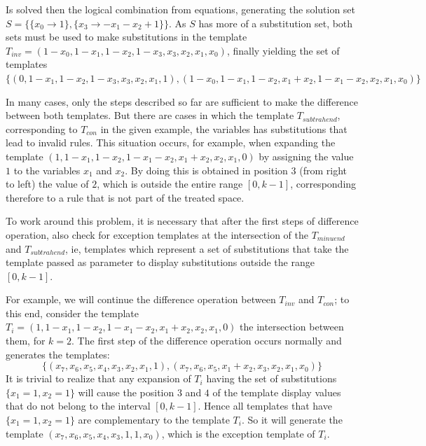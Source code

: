 \documentclass{llncs}
\begin{document}
Is solved then the logical combination from equations, generating the solution set $S = \{\{x_0\to 1\},\{x_3\to -x_1-x_2+1\}\}$. As $S$ has more of a substitution set, both sets must be used to make substitutions in the template $T_{inv} = (1 - x_0, 1 - x_1, 1 - x_2, 1 - x_3, x_3, x_2, x_1, x_0)$, finally yielding the set of templates $\{(0, 1 - x_1, 1 - x_2, 1 - x_3, x_3, x_2, x_1, 1),(1 - x_0, 1 - x_1, 1 - x_2, x_1 + x_2, 1 - x_1 - x_2, x_2, x_1, x_0)\}$

In many cases, only the steps described so far are sufficient to make the difference between both templates. But there are cases in which the template $T_{subtrahend}$, corresponding to $T_{con}$ in the given example, the variables has substitutions that lead to invalid rules. This situation occurs, for example, when expanding the template $(1, 1 - x_1, 1 - x_2, 1 - x_1 - x_2, x_1 + x_2, x_2, x_1, 0)$ by assigning the value $1$ to the variables $x_1$ and $x_2$. By doing this is obtained in position $3$ (from right to left) the value of $2$, which is outside the entire range $[0, k-1]$, corresponding therefore to a rule that is not part of the treated space.

To work around this problem, it is necessary that after the first steps of difference operation, also check for exception templates at the intersection of the $T_{minuend}$ and $T_{subtrahend}$, ie, templates which represent a set of substitutions that take the template passed as parameter to display  substitutions outside the range $[0,k-1]$. %

For example, we will continue the difference operation between $T_{inv}$ and $T_{con}$; to this end, consider the template $T_i = (1, 1 - x_1, 1 - x_2, 1 - x_1 - x_2, x_1 + x_2, x_2, x_1, 0)$ the intersection between them, for $k=2$.
The first step of the difference operation occurs normally and generates the templates: 
\begin{displaymath}
\{(x_7, x_6, x_5, x_4, x_3, x_2, x_1, 1),(x_7, x_6, x_5, x_1 + x_2, x_3, x_2, x_1, x_0)\}
\end{displaymath}
It is trivial to realize that any expansion of $T_i$ having the set of substitutions $\{x_1 = 1, x_2 = 1\}$ will cause the position $3$ and $4$ of the template display values that do not belong to the interval $[0,k-1]$.
Hence all templates that have $\{x_1 = 1, x_2 = 1\}$ are complementary to the template $T_i$. So it will generate the template $(x_7, x_6, x_5, x_4, x_3, 1, 1, x_0)$, which is the exception template of $T_i$.
\end{document}
